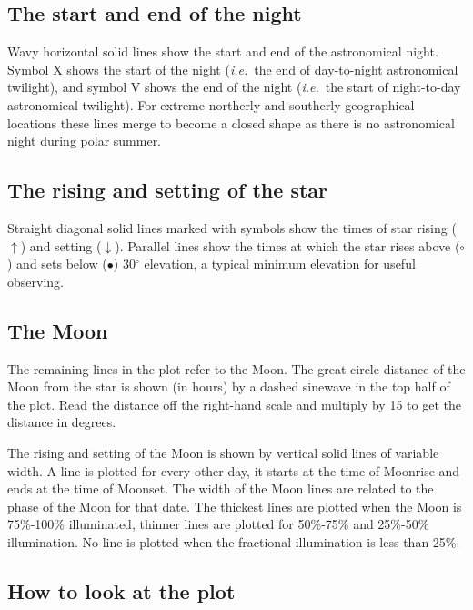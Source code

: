 \subsection{The start and end of the night}

Wavy horizontal solid lines show the start and end of the  astronomical night.
Symbol {\sf X}  shows the start of the night ({\em i.e.}~the end of
day-to-night astronomical  twilight), and  symbol {\sf V} shows the end of the
night ({\em i.e.}~the  start of night-to-day astronomical twilight). For
extreme  northerly and southerly geographical locations these lines merge to
become a closed shape as there is no astronomical night during polar summer.

\subsection{The rising and setting of the star}

Straight diagonal solid lines marked with symbols  show the times of star
rising ($\uparrow$) and setting ($\downarrow$). Parallel lines show the times
at  which the star rises above ($\circ$) and sets below ($\bullet$)
30$^{\circ}$ elevation, a typical minimum elevation for useful observing.

\subsection{The Moon}

The remaining lines in the plot refer to the Moon. The great-circle 
distance of the Moon 
from the star is shown (in hours) by a dashed sinewave in the top half of
the plot. Read the distance off the right-hand scale
and multiply by 15 to get the distance in degrees. 

The rising and setting  of the Moon is shown by vertical solid lines of
variable width. A line is  plotted for every other day, it starts at the time
of Moonrise and ends at  the time of Moonset. The width of the Moon lines are
related to the phase of  the Moon for that date. The thickest lines are plotted
when the Moon is  75\%-100\% illuminated, thinner lines are plotted for
50\%-75\% and 25\%-50\% illumination. No line is plotted when the fractional
illumination is less than  25\%.

\subsection{How to look at the plot}

